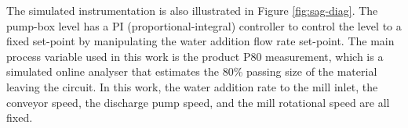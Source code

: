 The simulated instrumentation is also illustrated in Figure \ref{fig:sag-diag}. The pump-box level has a PI (proportional-integral) controller to control the level to a fixed set-point by manipulating the water addition flow rate set-point. The main process variable used in this work is the product P80 measurement, which is a simulated online analyser that estimates the 80\% passing size of the material leaving the circuit. In this work, the water addition rate to the mill inlet, the conveyor speed, the discharge pump speed, and the mill rotational speed are all fixed.

%
%
